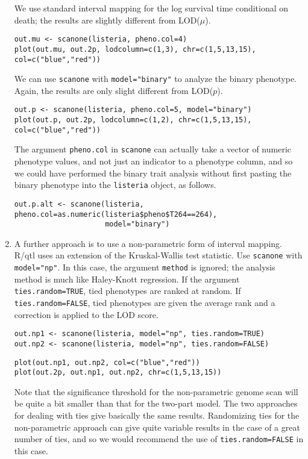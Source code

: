 \documentclass[10pt,letterpaper]{article}
\newcommand{\usercolor}{\color [named]{BlueViolet}}
\begin{document}
\begin{enumerate}
We use standard interval mapping for the log survival time conditional
on death; the results are slightly different from LOD($\mu$).

\usercolor
\verb|out.mu <- scanone(listeria, pheno.col=4)| \\
\verb|plot(out.mu, out.2p, lodcolumn=c(1,3), chr=c(1,5,13,15), col=c("blue","red"))|
\normalcolor

We can use \verb-scanone- with \verb-model="binary"- to analyze the
binary phenotype.  Again, the results are only slight different from
LOD($p$). 

\usercolor
\verb|out.p <- scanone(listeria, pheno.col=5, model="binary")| \\
\verb|plot(out.p, out.2p, lodcolumn=c(1,2), chr=c(1,5,13,15), col=c("blue","red"))|
\normalcolor

The argument \verb-pheno.col- in \verb-scanone- can actually take a
vector of numeric phenotype values, and not just an indicator to a
phenotype column, and so we could have performed the binary trait
analysis without first pasting the binary phenotype into the
\verb-listeria- object, as follows.

\usercolor
\verb|out.p.alt <- scanone(listeria, pheno.col=as.numeric(listeria$pheno$T264==264),|\\
\verb|                     model="binary")|
\normalcolor

\item A further approach is to use a non-parametric form of interval
mapping.  R/qtl uses an extension of the Kruskal-Wallis test
statistic.  Use \verb-scanone- with \verb-model="np"-.  In this case,
the argument \verb-method- is ignored; the analysis method is much
like Haley-Knott regression.  If the argument \verb-ties.random=TRUE-,
tied phenotypes are ranked at random.  If \verb-ties.random=FALSE-,
tied phenotypes are given the average rank and a correction is applied
to the LOD score.

\usercolor
\verb|out.np1 <- scanone(listeria, model="np", ties.random=TRUE)| \\
\verb|out.np2 <- scanone(listeria, model="np", ties.random=FALSE)| 

\verb|plot(out.np1, out.np2, col=c("blue","red"))| \\
\verb|plot(out.2p, out.np1, out.np2, chr=c(1,5,13,15))|
\normalcolor

Note that the significance threshold for the non-parametric genome
scan will be quite a bit smaller than that for the two-part model.
The two approaches for dealing with ties give basically the same
results.  Randomizing ties for the non-parametric approach can give
quite variable results in the case of a great number of ties, and so
we would recommend the use of \verb-ties.random=FALSE- in this case.

\end{enumerate}
\end{document}
